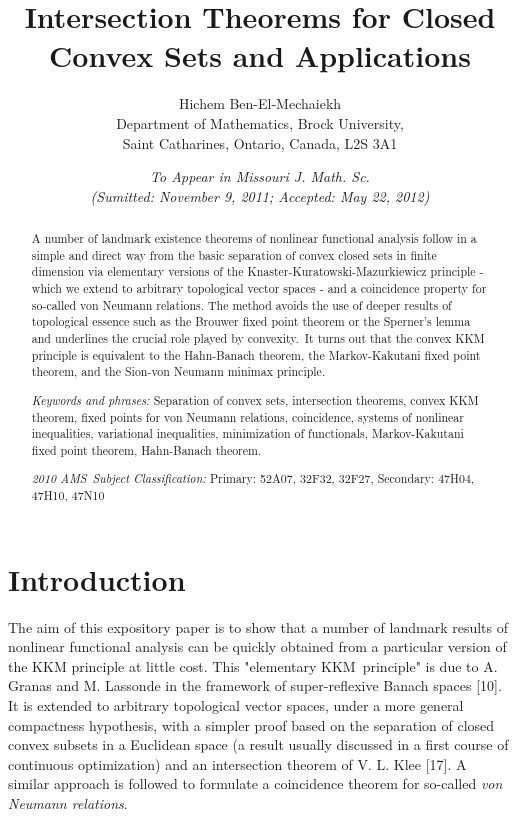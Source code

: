 \documentclass{article}
\begin{document}
\title{Intersection Theorems for Closed Convex Sets and Applications}
\author{Hichem Ben-El-Mechaiekh \\
Department of Mathematics, Brock University, \smallskip \\
Saint Catharines, Ontario, Canada, L2S 3A1}
\date{ \textit{To Appear in Missouri J. Math. Sc.}\\
\textit{(Sumitted: November 9, 2011; Accepted: May 22, 2012)}}
\maketitle

\begin{abstract}
A number of landmark existence theorems of nonlinear functional analysis
follow in a simple and direct way from the basic separation of convex closed
sets in finite dimension via elementary versions of the
Knaster-Kuratowski-Mazurkiewicz principle - which we extend to arbitrary
topological vector spaces - and a coincidence property for so-called von
Neumann relations. The method avoids the use of deeper results of
topological essence such as the Brouwer fixed point theorem or the Sperner's
lemma and underlines the crucial role played by convexity.\medskip\ It turns
out that the convex KKM principle is equivalent to the Hahn-Banach theorem,
the Markov-Kakutani fixed point theorem, and the Sion-von Neumann minimax
principle.

\textit{Keywords and phrases:} Separation of convex sets, intersection
theorems, convex KKM theorem, fixed points for von Neumann relations,
coincidence, systems of nonlinear inequalities, variational inequalities,
minimization of functionals, Markov-Kakutani fixed point theorem,
Hahn-Banach theorem.

\textit{2010 AMS\ Subject Classification: }Primary: 52A07, 32F32, 32F27,
Secondary: 47H04, 47H10, 47N10
\end{abstract}

\section{Introduction}

The aim of this expository paper is to show that a number of landmark
results of nonlinear functional analysis can be quickly obtained from a
particular version of the KKM principle at little cost. This "elementary
KKM\ principle" is due to A. Granas and M. Lassonde in the framework of
super-reflexive Banach spaces [10]. It is extended to arbitrary topological
vector spaces, under a more general compactness hypothesis, with a simpler
proof based on the separation of closed convex subsets in a Euclidean space
(a result usually discussed in a first course of continuous optimization)
and an intersection theorem of V. L. Klee [17]. A similar approach is
followed to formulate a coincidence theorem for so-called \textit{von
Neumann relations}.
\end{document}
